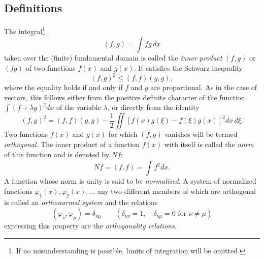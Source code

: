 \subsection{Definitions}
The integral\footnote{If no misunderstanding is possible, limits of integration will be omitted.}
\begin{equation}(f,g)=\int fg\,dx\tag{1}\end{equation}
taken over the (finite) fundamental domain is called the \emph{inner product} $(f,g)$ or $(fg)$ of two functions $f(x)$ and $g(x)$. It satisfies the Schwarz inequality
\begin{equation}(f,g)^2\le(f,f)(g,g),\tag{2}\end{equation}
where the equality holds if and only if $f$ and $g$ are proportional. As in the case of vectors, this follows either from the positive definite character of the function $\int(f+\lambda g)^2dx$ of the variable $\lambda$, or directly from the identity
\[(f,g)^2=(f,f)(g,g)-\frac12\iint[f(x)g(\xi)-f(\xi)g(x)]^2dx\,d\xi.\]
Two functions $f(x)$ and $g(x)$ for which $(f,g)$ vanishes will be termed \emph{orthogonal}. The inner product of a function $f(x)$ with itself is called the \emph{norm} of this function and is denoted by $Nf$:
\begin{equation}Nf=(f,f)=\int f^2dx.\tag{3}\end{equation}
A function whose norm is unity is said to be \emph{normalized}. A system of normalized functions $\varphi_1(x),\varphi_2(x),\ldots$ any two different members of which are orthogonal is called an \emph{orthonormal system} and the relations
\[(\varphi_\nu,\varphi_\mu)=\delta_{\nu\mu}\qquad(\delta_{\nu\nu}=1,\quad\delta_{\nu\mu}=0\text{ for }\nu\ne\mu)\]
expressing this property are the \emph{orthogonality relations}.


